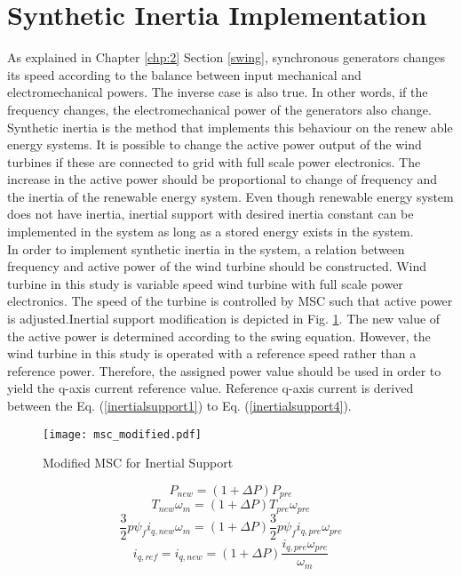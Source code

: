 \section{Synthetic Inertia Implementation}
As explained in Chapter \ref{chp:2} Section \ref{swing}, synchronous generators changes its speed according to the balance between input mechanical and electromechanical powers. The inverse case is also true. In other words, if the frequency changes, the electromechanical power of the generators also change. Synthetic inertia is the method that implements this behaviour on the renew able energy systems. It is possible to change the active power output of the wind turbines if these are connected to grid with full scale power electronics. The increase in the active power should be proportional to change of frequency and the inertia of the renewable energy system. Even though renewable energy system does not have inertia, inertial support with desired inertia constant can be implemented in the system as long as a stored energy exists in the system.\\
In order to implement synthetic inertia in the system, a relation between frequency and active power of the wind turbine should be constructed. Wind turbine in this study is variable speed wind turbine with full scale power electronics. The speed of the turbine is controlled by MSC such that active power is adjusted.Inertial support modification is depicted in Fig. \ref{modifiedmsc}. The new value of the active power is determined according to the swing equation. However, the wind turbine in this study is operated with a reference speed rather than a reference power. Therefore, the assigned power value should be used in order to yield the q-axis current reference value. Reference q-axis current is derived between the Eq. (\ref{inertialsupport1}) to Eq. (\ref{inertialsupport4}).\par
\begin{figure}[h!]
	\centering
	\texttt{[image: msc\_modified.pdf]}
	\caption{Modified MSC for Inertial Support}
	\label{modifiedmsc}
\end{figure}
\begin{equation}
P_{new}=(1+\Delta P) P_{pre}
\label{inertialsupport1}
\end{equation}
\begin{equation}
T_{new} \omega_{m}=(1+\Delta P) T_{pre} \omega_{pre}
\label{inertialsupport2}
\end{equation}
\begin{equation}
\frac{3}{2} p \psi_{f} i_{q,new} \omega_{m}=(1+\Delta P) \frac{3}{2} p \psi_{f} i_{q,pre} \omega_{pre}
\label{inertialsupport3}
\end{equation}
\begin{equation}
 i_{q,ref}=i_{q,new}=(1+\Delta P) \frac{i_{q,pre} \omega_{pre}}{ \omega_{m}} 
\label{inertialsupport4}
\end{equation}

